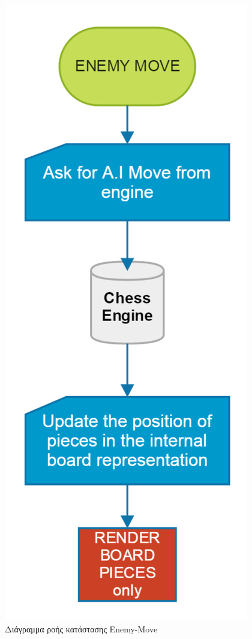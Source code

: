 \begin{figure}[H]
    \centering
    \includegraphics[scale=0.3]{Files/Figures/enemy_move.pdf}
    \caption[Διάγραμμα ροής κατάστασης Enemy-Move]{Διάγραμμα ροής κατάστασης Enemy-Move}
    \label{fig:enemy_move}
\end{figure}


